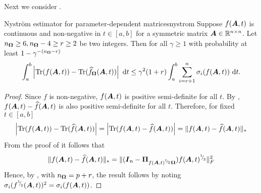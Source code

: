 \documentclass[12pt]{article}
\begin{document}
Next we consider . 

\begin{theorem}{Nyström estimator for parameter-dependent matrices}{nystrom}
    Suppose $f(\boldsymbol{A}, t)$ is continuous and non-negative in $t \in [a, b]$ for a symmetric matrix $\boldsymbol{A} \in \mathbb{R}^{n \times n}$. Let $n_{\boldsymbol{\Omega}} \geq 6, n_{\boldsymbol{\Omega}} - 4 \geq r \geq 2$ be two integers. Then for all $\gamma \geq 1$ with probability at least $1 - \gamma^{-(n_{\boldsymbol{\Omega}} - r)}$
    \begin{equation}
        \int_{a}^{b} \left| \operatorname{Tr}(f(\boldsymbol{A}, t)) - \operatorname{Tr}(\widehat{f}_{\boldsymbol{\Omega}}(\boldsymbol{A}, t)) \right| ~\mathrm{d}t
        \leq \gamma^2 (1 + r) \int_{a}^{b} \sum_{i = r+1}^{n} \sigma_i(f(\boldsymbol{A}, t)) ~\mathrm{d}t.
    \end{equation}
\end{theorem}

\begin{proof}
    Since $f$ is non-negative, $f(\boldsymbol{A}, t)$ is positive semi-definite for all $t$. By \cite[lemma 2.1]{frangella-2023-randomized-nystrom}, $f(\boldsymbol{A}, t) - \widehat{f}(\boldsymbol{A}, t)$ is also positive semi-definite for all $t$. Therefore, for fixed $t \in [a, b]$
    \begin{equation}
        \left| \operatorname{Tr}(f(\boldsymbol{A}, t)) - \operatorname{Tr}(\widehat{f}(\boldsymbol{A}, t)) \right|
        = \left| \operatorname{Tr}(f(\boldsymbol{A}, t) - \widehat{f}(\boldsymbol{A}, t)) \right|
        = \lVert f(\boldsymbol{A}, t) - \widehat{f}(\boldsymbol{A}, t) \rVert _{\ast}
    \end{equation}
    From the proof of \cite[corollary 8.2]{tropp-2023-randomized-algorithms} it follows that
    \begin{equation}
        \lVert f(\boldsymbol{A}, t) - \widehat{f}(\boldsymbol{A}, t) \rVert _{\ast} = \lVert (\boldsymbol{I}_n - \boldsymbol{\Pi}_{f(\boldsymbol{A}, t)^{{}^{1}{\mskip -5mu/\mskip -3mu}_{2}} \boldsymbol{\Omega}}) f(\boldsymbol{A}, t)^{{}^{1}{\mskip -5mu/\mskip -3mu}_{2}} \rVert _F^2
    \end{equation}
    Hence, by \cite[theorem 9]{kressner-2023-randomized-lowrank}, with $n_{\boldsymbol{\Omega}} = p + r$, the result follows by noting $\sigma_i(f^{{}^{1}{\mskip -5mu/\mskip -3mu}_{2}}(\boldsymbol{A}, t))^{2} = \sigma_i(f(\boldsymbol{A}, t))$.
\end{proof}
\end{document}

